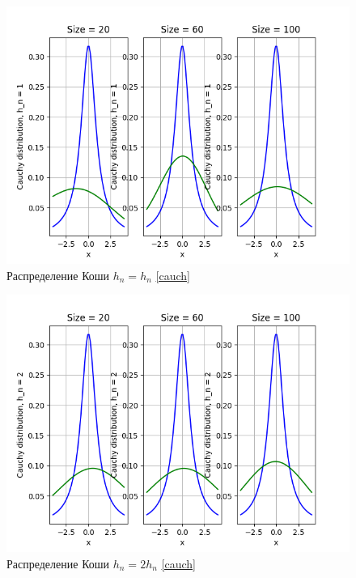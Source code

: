 \documentclass[a4paper]{article}
\begin{document}
        \begin{figure}[H]
            \centering
            \includegraphics[scale = 0.4]{Cauchy distribution, h_n = 1.png}
            \caption{Распределение Коши $h_n = h_n$ \eqref{cauch}}
            \label{fig:cauchy}
        \end{figure}
        
        \begin{figure}[H]
            \centering
            \includegraphics[scale = 0.4]{Cauchy distribution, h_n = 2.png}
            \caption{Распределение Коши $h_n = 2 h_n$ \eqref{cauch}}
            \label{fig:cauchy}
        \end{figure}
        
\end{document}
